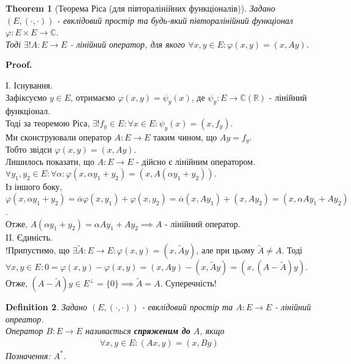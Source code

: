 \documentclass[a4paper, 10pt]{article}
\makeatletter
\theoremstyle{theoremdd}
\newtheorem{theorem}{Theorem}[subsection]
\newtheorem{definition}[theorem]{Definition}
\renewenvironment{proof}[1][Proof.\\]{\par
\pushQED{\hfill \qed}%
\normalfont \topsep6\p@\@plus6\p@\relax
\trivlist
\item\relax
{\bfseries
#1\@addpunct{.}}\hspace\labelsep\ignorespaces
}{%
\popQED\endtrivlist\@endpefalse
}
\makeatother
\begin{document}
\begin{theorem}[Теорема Ріса (для півторалінійних функціоналів)]
Задано $(E,(\cdot,\cdot))$ - евклідовий простір та будь-який півторалінійний функціонал $\varphi: E \times E \to \mathbb{C}$.\\
Тоді $\exists! A: E \to E$ - лінійний оператор, для якого $\forall x,y \in E: \varphi(x,y) = (x,Ay)$.
\end{theorem}

\begin{proof}
I. Існування.\\
Зафіксуємо $y \in E$, отримаємо $\varphi(x,y) = \psi_y(x)$, де $\psi_y: E \to \mathbb{C} (\mathbb{R})$ - лінійний функціонал.\\
Тоді за теоремою Ріса, $\exists! f_y \in E: \forall x \in E: \psi_y(x) = (x,f_y)$.\\
Ми сконструювали оператор $A: E \to E$ таким чином, що $Ay = f_y$.\\
Тобто звідси $\varphi(x,y) = (x,Ay)$.\\
Лишилось показати, що $A: E \to E$ - дійсно є лінійним оператором.\\
$\forall y_1,y_2 \in E: \forall \alpha: \varphi(x,\alpha y_1 + y_2) = (x,A(\alpha y_1 + y_2))$.\\
Із іншого боку, $\varphi(x,\alpha y_1 + y_2) = \overline{\alpha} \varphi(x,y_1) + \varphi(x,y_2) = \overline{\alpha} (x,Ay_1) + (x,Ay_2) = (x, \alpha Ay_1 + Ay_2)$.\\
Отже, $A(\alpha y_1 + y_2) = \alpha Ay_1 + Ay_2 \implies A$ - лінійний оператор.
\bigskip \\
II. Єдиність.\\
!Припустимо, що $\exists \tilde{A}: E \to E: \varphi(x,y) = (x,\tilde{A}y)$, але при цьому $\tilde{A} \neq A$. Тоді\\
$\forall x,y \in E: 0 = \varphi(x,y) - \varphi(x,y) = (x,Ay) - (x,\tilde{A}y) = (x,(A-\tilde{A})y)$.\\
Отже, $(A-\tilde{A})y \in E^\perp = \{0\} \implies \tilde{A} = A$. Суперечність!
\end{proof}

\begin{definition}
Задано $(E,(\cdot,\cdot))$ - евклідовий простір та $A: E \to E$ - лінійний опреатор.\\
Оператор $B: E \to E$ називається \textbf{спряженим до} $A$, якщо
\begin{align*}
\forall x,y \in E: (Ax,y) = (x,By)
\end{align*}
Позначення: $A^*$.
\end{definition}
\end{document}
